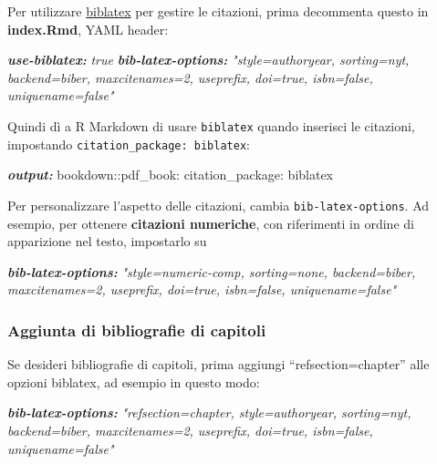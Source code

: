 \documentclass[a4paper, 11pt, nobind]{templates/ociamthesis}
\newenvironment{Shaded}{\begin{snugshade}}{\end{snugshade}}
\newcommand{\AnnotationTok}[1]{\textcolor[rgb]{0.56,0.35,0.01}{\textbf{\textit{#1}}}}
\newcommand{\CommentTok}[1]{\textcolor[rgb]{0.56,0.35,0.01}{\textit{#1}}}
\newcommand{\NormalTok}[1]{#1}
\renewenvironment{Shaded}
{
  \vspace{10pt}%
  \begin{snugshade}%
}{%
  \end{snugshade}%
  \vspace{8pt}%
}
\begin{document}
Per utilizzare \href{https://www.overleaf.com/learn/latex/Bibliography_management_with_biblatex}{biblatex} per gestire le citazioni, prima decommenta questo in \textbf{index.Rmd}, YAML header:

\begin{Shaded}
\begin{Highlighting}[]
\AnnotationTok{use{-}biblatex:}\CommentTok{ true}
\AnnotationTok{bib{-}latex{-}options:}\CommentTok{ "style=authoryear, sorting=nyt, backend=biber, maxcitenames=2, useprefix, doi=true, isbn=false, uniquename=false"}
\end{Highlighting}
\end{Shaded}

Quindi dì a R Markdown di usare \texttt{biblatex} quando inserisci le citazioni, impostando \texttt{citation\_package:\ biblatex}:

\begin{Shaded}
\begin{Highlighting}[]
\AnnotationTok{output:}
\NormalTok{  bookdown::pdf\_book:}
\NormalTok{    citation\_package: biblatex}
\end{Highlighting}
\end{Shaded}

Per personalizzare l'aspetto delle citazioni, cambia \texttt{bib-latex-options}. Ad esempio, per ottenere \textbf{citazioni numeriche}, con riferimenti in ordine di apparizione nel testo, impostarlo su

\begin{Shaded}
\begin{Highlighting}[]
\AnnotationTok{bib{-}latex{-}options:}\CommentTok{ "style=numeric{-}comp, sorting=none, backend=biber, maxcitenames=2, useprefix, doi=true, isbn=false, uniquename=false"}
\end{Highlighting}
\end{Shaded}

\hypertarget{aggiunta-di-bibliografie-di-capitoli}{%
\subsubsection{Aggiunta di bibliografie di capitoli}\label{aggiunta-di-bibliografie-di-capitoli}}

Se desideri bibliografie di capitoli, prima aggiungi ``refsection=chapter'' alle opzioni biblatex, ad esempio in questo modo:

\begin{Shaded}
\begin{Highlighting}[]
\AnnotationTok{bib{-}latex{-}options:}\CommentTok{ "refsection=chapter, style=authoryear, sorting=nyt, backend=biber, maxcitenames=2, useprefix, doi=true, isbn=false, uniquename=false"}
\end{Highlighting}
\end{Shaded}
\end{document}
